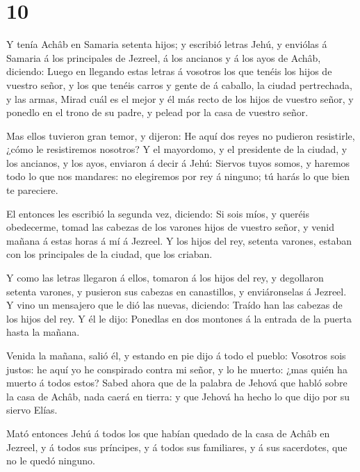 \hypertarget{section-9}{%
\section{10}\label{section-9}}

 Y tenía Achâb en Samaria setenta hijos; y escribió letras
Jehú, y enviólas á Samaria á los principales de Jezreel, á los ancianos
y á los ayos de Achâb, diciendo:  Luego en llegando estas
letras á vosotros los que tenéis los hijos de vuestro señor, y los que
tenéis carros y gente de á caballo, la ciudad pertrechada, y las armas,
 Mirad cuál es el mejor y él más recto de los hijos de
vuestro señor, y ponedlo en el trono de su padre, y pelead por la casa
de vuestro señor.

 Mas ellos tuvieron gran temor, y dijeron: He aquí dos reyes
no pudieron resistirle, ¿cómo le resistiremos nosotros?  Y
el mayordomo, y el presidente de la ciudad, y los ancianos, y los ayos,
enviaron á decir á Jehú: Siervos tuyos somos, y haremos todo lo que nos
mandares: no elegiremos por rey á ninguno; tú harás lo que bien te
pareciere.

 El entonces les escribió la segunda vez, diciendo: Si sois
míos, y queréis obedecerme, tomad las cabezas de los varones hijos de
vuestro señor, y venid mañana á estas horas á mí á Jezreel. Y los hijos
del rey, setenta varones, estaban con los principales de la ciudad, que
los criaban.

 Y como las letras llegaron á ellos, tomaron á los hijos del
rey, y degollaron setenta varones, y pusieron sus cabezas en
canastillos, y enviáronselas á Jezreel.  Y vino un mensajero
que le dió las nuevas, diciendo: Traído han las cabezas de los hijos del
rey. Y él le dijo: Ponedlas en dos montones á la entrada de la puerta
hasta la mañana.

 Venida la mañana, salió él, y estando en pie dijo á todo el
pueblo: Vosotros sois justos: he aquí yo he conspirado contra mi señor,
y lo he muerto: ¿mas quién ha muerto á todos estos?  Sabed
ahora que de la palabra de Jehová que habló sobre la casa de Achâb, nada
caerá en tierra: y que Jehová ha hecho lo que dijo por su siervo Elías.

 Mató entonces Jehú á todos los que habían quedado de la
casa de Achâb en Jezreel, y á todos sus príncipes, y á todos sus
familiares, y á sus sacerdotes, que no le quedó ninguno.

